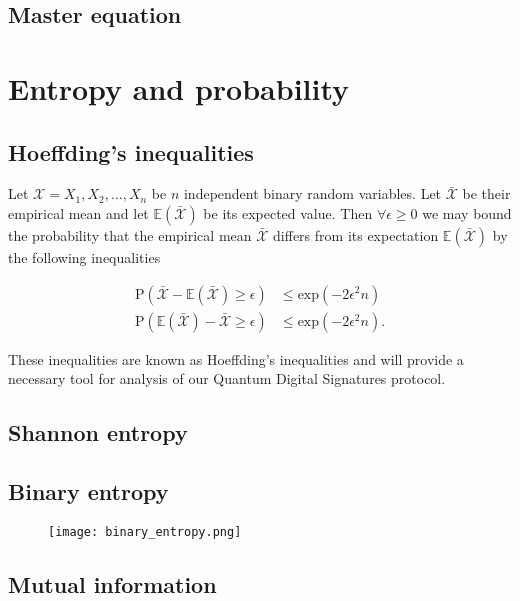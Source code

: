 \subsection{Master equation}


\section{Entropy and probability}

\subsection{Hoeffding's inequalities}
Let $\mathcal{X} = X_1, X_2, \dots, X_n$ be $n$ independent binary random variables. Let $\bar{\mathcal{X}}$ be their empirical mean  and let $\mathbb{E}\left(\bar{\mathcal{X}}\right)$ be its expected value. Then $\forall \epsilon \ge 0$ we may bound the probability that the empirical mean $\bar{\mathcal{X}}$ differs from its expectation $\mathbb{E}\left(\bar{\mathcal{X}}\right)$ by the following inequalities

\begin{align}
\label{eqn:hoeffding1}
\text{P}\left(\bar{\mathcal{X}} - \mathbb{E}\left(\bar{\mathcal{X}}\right) \ge \epsilon\right) &\le \text{exp}\left(- 2 \epsilon^2 n\right) \\
\label{eqn:hoeffding2}
\text{P}\left(\mathbb{E}\left(\bar{\mathcal{X}}\right) - \bar{\mathcal{X}} \ge \epsilon\right) &\le \text{exp}\left(- 2 \epsilon^2 n\right).
\end{align}





\noindent These inequalities are known as Hoeffding's inequalities  and will provide a necessary tool for analysis of our Quantum Digital Signatures protocol.


\subsection{Shannon entropy}
\subsection{Binary entropy}
\begin{figure}
\centering
\texttt{[image: binary\_entropy.png]}
\caption{\label{fig:binary_entropy}}
\end{figure}

\subsection{Mutual information}

